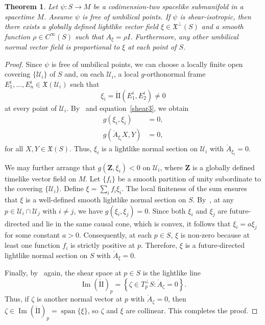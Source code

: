 \documentclass[11pt]{article}
\numberwithin{equation}{section}
\newtheorem{theorem}{Theorem}[section]
\begin{document}
	\begin{theorem}\label{shear1theo}
		Let $\psi \colon  S \to M$ be a codimension-two spacelike submanifold in a spacetime $M$. Assume $\psi$ is free of umbilical points. If $\psi$ is shear-isotropic, then there exists a globally defined lightlike vector field $\xi \in {\mathfrak X}^\perp(S)$ and a smooth function $\rho \in C^\infty(S)$ such that $A_{\xi} = \rho I$. Furthermore, any other umbilical normal vector field is proportional to $\xi$ at each point of $S$. 
	\end{theorem} 
\begin{proof}
	Since $\psi$ is free of umbilical points, we can choose a locally finite open covering $\{\mathscr{U}_i\}$ of $S$ and, on each $\mathscr{U}_i$, a local $g$-orthonormal frame $E_{1}^i, \ldots, E_{n}^i \in \mathfrak{X}(\mathscr{U}_i)$ such that
	\[
	\xi_i = \mathring{\mathrm{II}}(E_{1}^i, E_{2}^i) \neq 0
	\]
	at every point of $\mathscr{U}_i$. By~ and equation~\eqref{shear3}, we obtain
	\begin{align*}
		g(\xi_i, \xi_i) &= 0, \\
		g(\mathring{A}_{\xi_i}X, Y) &= 0,
	\end{align*}
	for all $X, Y \in \mathfrak{X}(S)$. Thus, $\xi_i$ is a lightlike normal section on $\mathscr{U}_i$ with $\mathring{A}_{\xi_i} = 0$.
	
	We may further arrange that $g(\mathbf{Z}, \xi_i) < 0$ on $\mathscr{U}_i$, where $\mathbf{Z}$ is a globally defined timelike vector field on $M$. Let $\{ f_i \}$ be a smooth partition of unity subordinate to the covering $\{\mathscr{U}_i\}$. Define $\xi = \sum_i f_i \xi_i$. The local finiteness of the sum ensures that $\xi$ is a well-defined smooth lightlike normal section on $S$. By~, at any $p \in \mathscr{U}_i \cap \mathscr{U}_j$ with $i \neq j$, we have $g(\xi_i, \xi_j) = 0$. Since both $\xi_i$ and $\xi_j$ are future-directed and lie in the same causal cone, which is convex, it follows that $\xi_i = a \xi_j$ for some constant $a > 0$. Consequently, at each $p \in S$, $\xi$ is non-zero because at least one function $f_i$ is strictly positive at $p$. Therefore, $\xi$ is a future-directed lightlike normal section on $S$ with $\mathring{A}_{\xi} = 0$.
	
	Finally, by~ again, the shear space at $p \in S$ is the lightlike line
	\[
	\operatorname{Im}(\mathring{\mathrm{II}})_p = \left\{\zeta \in T_p^\perp S : \mathring{A}_\zeta = 0\right\}.
	\]
	Thus, if $\zeta$ is another normal vector at $p$ with $\mathring{A}_\zeta = 0$, then $\zeta \in \operatorname{Im}(\mathring{\mathrm{II}})_p = \operatorname{span}\{\xi\}$, so $\zeta$ and $\xi$ are collinear. This completes the proof.
\end{proof}
	
\end{document}

